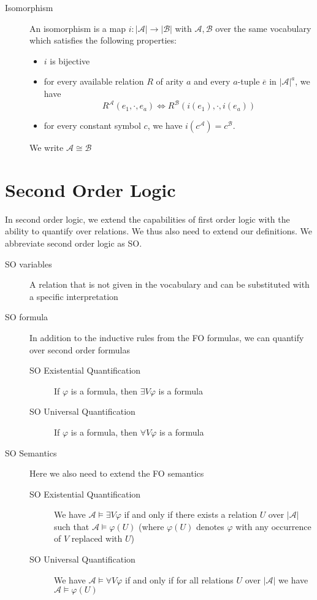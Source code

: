 \begin{description}
    \item[Isomorphism] An isomorphism is a map $i: |\mathcal{A}| \to |\mathcal{B}|$ with $\mathcal{A}, \mathcal{B}$ over the same vocabulary which satisfies the following properties:
    \begin{itemize}
        \setlength\itemsep{0.2em}
        \item $i$ is bijective
        \item for every available relation $R$ of arity $a$ and every $a$-tuple $\overline{e}$ in $|\mathcal{A}|^a$, we have \[R^{\mathcal{A}}(e_1, \cdot, e_a) \Leftrightarrow R^{\mathcal{B}}(i(e_1), \cdot, i(e_a))\]
        \item for every constant symbol $c$, we have $i(c^{\mathcal{A}}) = c^{\mathcal{B}}$.
    \end{itemize}
    We write $\mathcal{A} \cong \mathcal{B}$
\end{description}


\section{Second Order Logic}\label{sec:second-order-logic}
In second order logic, we extend the capabilities of first order logic with the ability to quantify over relations.
We thus also need to extend our definitions.
We abbreviate second order logic as SO\@.
\begin{description}
    \item[SO variables] A relation that is not given in the vocabulary and can be substituted with a specific interpretation
    \item[SO formula] In addition to the inductive rules from the FO formulas, we can quantify over second order formulas
    \begin{description}
        \item[SO Existential Quantification] If $\varphi$ is a formula, then $\exists V\varphi$ is a formula
        \item[SO Universal Quantification] If $\varphi$ is a formula, then $\forall V\varphi$ is a formula
    \end{description}
    \item[SO Semantics] Here we also need to extend the FO semantics
    \begin{description}
        \item[SO Existential Quantification]  We have $\mathcal{A} \models \exists V\varphi$ if and only if there exists a relation $U$ over $|\mathcal{A}|$ such that $\mathcal{A} \models \varphi(U)$ (where $\varphi(U)$ denotes $\varphi$ with any occurrence of $V$ replaced with $U$)
        \item[SO Universal Quantification] We have $\mathcal{A} \models \forall V\varphi$ if and only if for all relations $U$ over $|\mathcal{A}|$ we have $\mathcal{A} \models \varphi(U)$
    \end{description}
\end{description}



